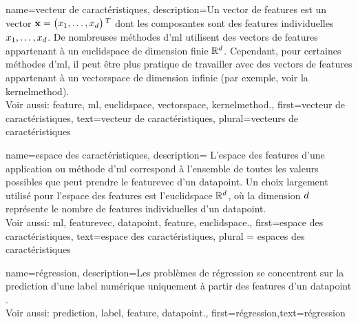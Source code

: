 {name={vecteur de caractéristiques},
	description={Un  \gls{vector} de \glspl{feature} est un \gls{vector} 
		${\bf x} = \big(x_{1},\ldots,x_{d}\big)\,^{T}$ dont les composantes sont des \glspl{feature} individuelles 
		$x_{1},\ldots,x_{d}$. De nombreuses méthodes d'\gls{ml} utilisent des \glspl{vector} de \glspl{feature} 
		appartenant à un \gls{euclidspace} de dimension finie $\mathbb{R}^{d}$. 
		Cependant, pour certaines méthodes d'\gls{ml}, il peut être plus pratique de travailler avec des 
		\glspl{vector} de \glspl{feature} appartenant à un \gls{vectorspace} de dimension infinie 
		(par exemple, voir la \gls{kernelmethod}). 
		\\
		Voir aussi: \gls{feature}, \gls{ml}, \gls{euclidspace}, \gls{vectorspace}, \gls{kernelmethod}.},
	first={vecteur de caractéristiques},
	text={vecteur de caractéristiques},
	plural={vecteurs de caractéristiques}
}

{name={espace des caractéristiques},
	description={
		L’espace des \glspl{feature} d’une application ou méthode d'\gls{ml} 
		correspond à l’ensemble de toutes les valeurs possibles que peut prendre le \gls{featurevec} 
		d’un \gls{datapoint}. Un choix largement utilisé pour l’espace des \glspl{feature} est l’\gls{euclidspace} 
		$\mathbb{R}^{d}$, où la dimension $d$ représente le nombre de \glspl{feature} individuelles 
		d’un \gls{datapoint}.
		\\
		Voir aussi: \gls{ml}, \gls{featurevec}, \gls{datapoint}, \gls{feature}, \gls{euclidspace}.},
	first={espace des caractéristiques},
	text={espace des caractéristiques}, plural = {espaces des caractéristiques}
}

{name={régression},
	description={Les problèmes de régression se concentrent sur la \gls{prediction} d'une \gls{label} numérique uniquement à partir des \glspl{feature} d'un \gls{datapoint} \cite[Ch. 2]{MLBasics}.
		\\ 
		Voir aussi: \gls{prediction}, \gls{label}, \gls{feature}, \gls{datapoint}.},
	first={régression},text={régression} 
}

